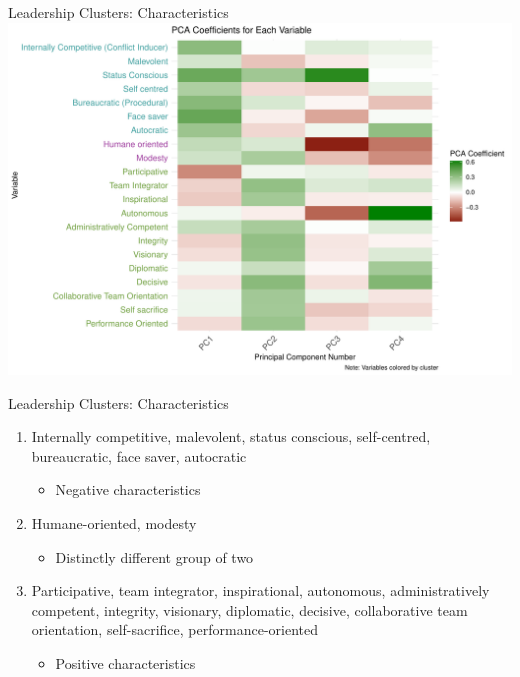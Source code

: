 \documentclass[
  ignorenonframetext,
]{beamer}
\providecommand{\tightlist}{%
  \setlength{\itemsep}{0pt}\setlength{\parskip}{0pt}}
\begin{document}
\begin{frame}{Leadership Clusters: Characteristics}
\protect\hypertarget{leadership-clusters-characteristics}{}
\includegraphics{final_slides_files/figure-beamer/pca_heatmap-1.pdf}
\end{frame}

\begin{frame}{Leadership Clusters: Characteristics}
\protect\hypertarget{leadership-clusters-characteristics-1}{}

\begin{enumerate}
\item
  \textcolor{clust1}{Internally competitive, malevolent, status conscious, self-centred, bureaucratic, face saver, autocratic}

  \begin{itemize}
  \tightlist
  \item
    Negative characteristics
  \end{itemize}
\item
  \textcolor{clust2}{Humane-oriented, modesty}

  \begin{itemize}
  \tightlist
  \item
    Distinctly different group of two
  \end{itemize}
\item
  \textcolor{clust3}{Participative, team integrator, inspirational, autonomous, administratively competent, integrity, visionary, diplomatic, decisive, collaborative team orientation, self-sacrifice, performance-oriented}

  \begin{itemize}
  \tightlist
  \item
    Positive characteristics
  \end{itemize}
\end{enumerate}
\end{frame}
\end{document}
